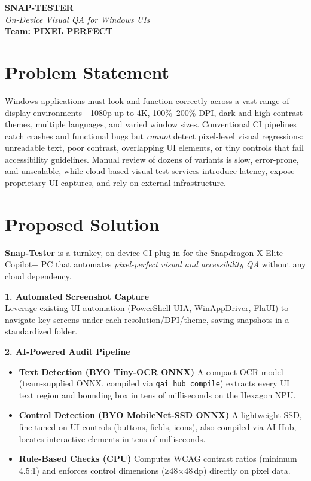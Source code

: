 \documentclass[11pt,a4paper]{article}
\newcommand{\sectionline}{
  \nointerlineskip \vspace{1.5ex}
  \par\noindent\makebox[\linewidth]{\rule{\linewidth}{0.4pt}}
  \vspace{1ex}
}
\begin{document}
\pagestyle{empty}

\begin{center}
  {\LARGE\bfseries SNAP-TESTER}\\[0.5ex]
  {\large\itshape On-Device Visual QA for Windows UIs}\\[2ex]
  {\large\textbf{Team: PIXEL PERFECT}}
\end{center}

\sectionline

\doublespacing

\section*{Problem Statement}
Windows applications must look and function correctly across a vast range of display environments—1080p up to 4K, 100\%–200\% DPI, dark and high-contrast themes, multiple languages, and varied window sizes. Conventional CI pipelines catch crashes and functional bugs but \emph{cannot} detect pixel-level visual regressions: unreadable text, poor contrast, overlapping UI elements, or tiny controls that fail accessibility guidelines. Manual review of dozens of variants is slow, error-prone, and unscalable, while cloud-based visual-test services introduce latency, expose proprietary UI captures, and rely on external infrastructure.

\sectionline

\section*{Proposed Solution}
\textbf{Snap-Tester} is a turnkey, on-device CI plug-in for the Snapdragon X Elite Copilot+ PC that automates \emph{pixel-perfect visual and accessibility QA} without any cloud dependency.  

\medskip
\noindent\textbf{1. Automated Screenshot Capture}\\
Leverage existing UI-automation (PowerShell UIA, WinAppDriver, FlaUI) to navigate key screens under each resolution/DPI/theme, saving snapshots in a standardized folder.

\medskip
\noindent\textbf{2. AI-Powered Audit Pipeline}\\
\begin{itemize}[leftmargin=*,itemsep=1ex]
  \item \textbf{Text Detection (BYO Tiny-OCR ONNX)}  
    A compact OCR model (team-supplied ONNX, compiled via \texttt{qai\_hub compile}) extracts every UI text region and bounding box in tens of milliseconds on the Hexagon NPU.
  \item \textbf{Control Detection (BYO MobileNet-SSD ONNX)}  
    A lightweight SSD, fine-tuned on UI controls (buttons, fields, icons), also compiled via AI Hub, locates interactive elements in tens of milliseconds.
  \item \textbf{Rule-Based Checks (CPU)}  
    Computes WCAG contrast ratios (minimum 4.5:1) and enforces control dimensions (≥48×48\,dp) directly on pixel data.
\end{itemize}
\end{document}
